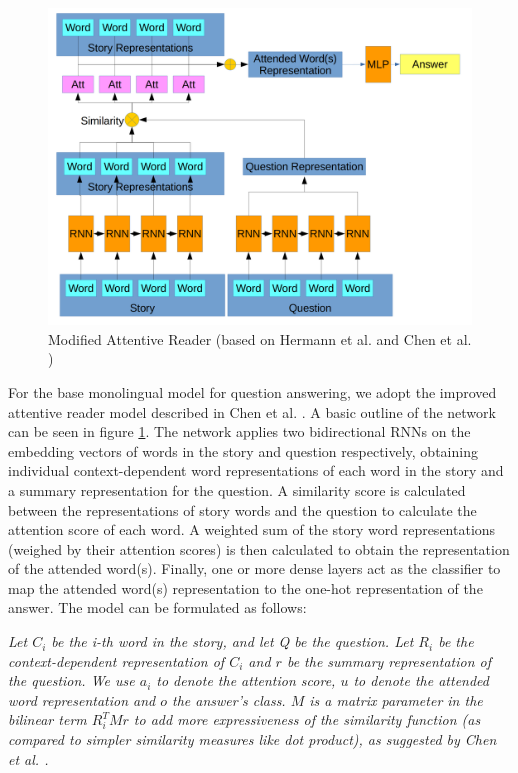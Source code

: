 \documentclass[]{article}
\begin{document}
\begin{center}
	\begin{figure}
		\includegraphics[width=\linewidth]{media/attentive.png}
		\caption{Modified Attentive Reader (based on Hermann et al. \cite{hermann2015teaching} and Chen et al. \cite{chen2016thorough})}
		\label{fig:attentive}
	\end{figure}
\end{center}

For the base monolingual model for question answering, we adopt the improved attentive reader model described in Chen et al. \cite{chen2016thorough}. A basic outline of the network can be seen in figure \ref{fig:attentive}. The network applies two bidirectional RNNs on the embedding vectors of words in the story and question respectively, obtaining individual context-dependent word representations of each word in the story and a summary representation for the question. A similarity score is calculated between the representations of story words and the question to calculate the attention score of each word. A weighted sum of the story word representations (weighed by their attention scores) is then calculated to obtain the representation of the attended word(s). Finally, one or more dense layers act as the classifier to map the attended word(s) representation to the one-hot representation of the answer. The model can be formulated as follows:

\textit{Let $C_i$ be the i-th word in the story, and let Q be the question. Let $R_i$ be the context-dependent representation of $C_i$ and $r$ be the summary representation of the question. We use $a_i$ to denote the attention score, $u$ to denote the attended word representation and $o$ the answer's class. $M$ is a matrix parameter in the bilinear term $R_i^T M r$ to add more expressiveness of the similarity function (as compared to simpler similarity measures like dot product), as suggested by Chen et al. \cite{chen2016thorough}.}
\end{document}
